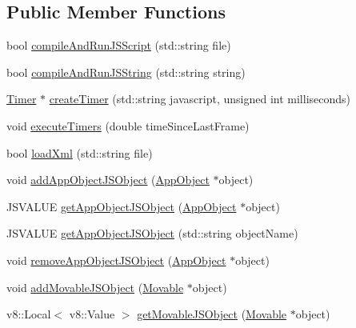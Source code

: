 \subsection*{Public Member Functions}
\begin{DoxyCompactItemize}
\item 
bool \hyperlink{class_rad_xml_1_1_rad_x_m_l_a9bb48a0f8a2031778847dada3a541ff5}{compile\-And\-Run\-J\-S\-Script} (std\-::string file)
\item 
bool \hyperlink{class_rad_xml_1_1_rad_x_m_l_a27dd98dc1eace0195160091d116267f0}{compile\-And\-Run\-J\-S\-String} (std\-::string string)
\item 
\hyperlink{class_rad_xml_1_1_timer}{Timer} $\ast$ \hyperlink{class_rad_xml_1_1_rad_x_m_l_a60fa16cf43e2fe71ba4a45a8c4e1587a}{create\-Timer} (std\-::string javascript, unsigned int milliseconds)
\item 
void \hyperlink{class_rad_xml_1_1_rad_x_m_l_a215870f9886ee55cf6f8512d70606f6c}{execute\-Timers} (double time\-Since\-Last\-Frame)
\item 
bool \hyperlink{class_rad_xml_1_1_rad_x_m_l_a15cb77df75e0006238d79396f9fb8807}{load\-Xml} (std\-::string file)
\item 
void \hyperlink{class_rad_xml_1_1_rad_x_m_l_ae7292264408379b2bc88612904db4cea}{add\-App\-Object\-J\-S\-Object} (\hyperlink{class_rad_xml_1_1_app_object}{App\-Object} $\ast$object)
\item 
J\-S\-V\-A\-L\-U\-E \hyperlink{class_rad_xml_1_1_rad_x_m_l_a963da38ad88c88224560cc5f1cf27cf9}{get\-App\-Object\-J\-S\-Object} (\hyperlink{class_rad_xml_1_1_app_object}{App\-Object} $\ast$object)
\item 
J\-S\-V\-A\-L\-U\-E \hyperlink{class_rad_xml_1_1_rad_x_m_l_a8a8da3532713b5ab1c03892c794dd1e3}{get\-App\-Object\-J\-S\-Object} (std\-::string object\-Name)
\item 
void \hyperlink{class_rad_xml_1_1_rad_x_m_l_a54e84daa3b0cad8d570f9bcdf20c566d}{remove\-App\-Object\-J\-S\-Object} (\hyperlink{class_rad_xml_1_1_app_object}{App\-Object} $\ast$object)
\item 
void \hyperlink{class_rad_xml_1_1_rad_x_m_l_a5bdfc836108100403b93b1e73c6baff1}{add\-Movable\-J\-S\-Object} (\hyperlink{class_rad_xml_1_1_movable}{Movable} $\ast$object)
\item 
v8\-::\-Local$<$ v8\-::\-Value $>$ \hyperlink{class_rad_xml_1_1_rad_x_m_l_ac42fe8c75a15e4b28b4606eea1879263}{get\-Movable\-J\-S\-Object} (\hyperlink{class_rad_xml_1_1_movable}{Movable} $\ast$object)
\item 

\end{DoxyCompactItemize}
